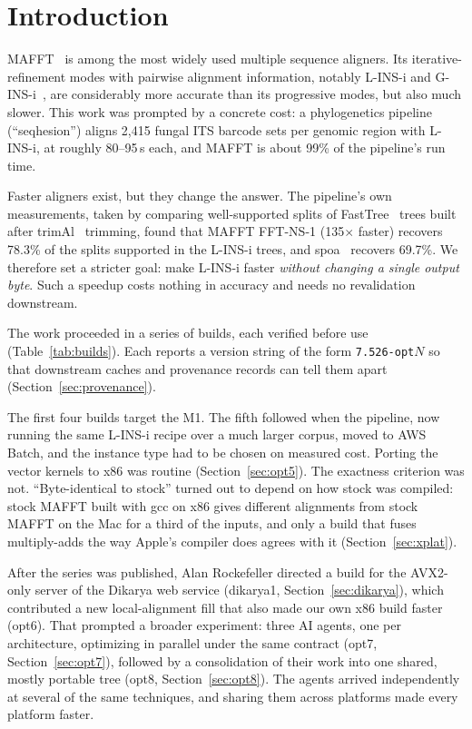 \documentclass[11pt]{article}
\newcommand{\code}[1]{\texttt{#1}}
\begin{document}
\section{Introduction}

MAFFT~\cite{katoh2002,katoh2013} is among the most widely used multiple sequence aligners.
Its iterative-refinement modes with pairwise alignment information, notably L-INS-i and
G-INS-i~\cite{katoh2005}, are considerably more accurate than its progressive modes, but
also much slower. This work was prompted by a concrete cost: a phylogenetics pipeline
(``seqhesion'') aligns 2{,}415 fungal ITS barcode sets per genomic region with L-INS-i, at
roughly 80--95\,s each, and MAFFT is about 99\% of the pipeline's run time.

Faster aligners exist, but they change the answer. The pipeline's own measurements, taken
by comparing well-supported splits of FastTree~\cite{price2010} trees built after
trimAl~\cite{capella2009} trimming, found that MAFFT FFT-NS-1 (135$\times$ faster) recovers
78.3\% of the splits supported in the L-INS-i trees, and spoa~\cite{vaser2017} recovers
69.7\%. We therefore set a stricter goal: make L-INS-i faster \emph{without changing a single
output byte}. Such a speedup costs nothing in accuracy and needs no revalidation downstream.

The work proceeded in a series of builds, each verified before use
(Table~\ref{tab:builds}). Each reports a version string of the form \code{7.526-opt}$N$ so
that downstream caches and provenance records can tell them apart
(Section~\ref{sec:provenance}).

The first four builds target the M1. The fifth followed when the pipeline, now running the
same L-INS-i recipe over a much larger corpus, moved to AWS Batch, and the instance type had to be chosen on measured cost. Porting the vector kernels to
x86 was routine (Section~\ref{sec:opt5}). The exactness criterion was not. ``Byte-identical to
stock'' turned out to depend on how stock was compiled: stock MAFFT built with gcc on x86
gives different alignments from stock MAFFT on the Mac for a third of the inputs, and only a
build that fuses multiply-adds the way Apple's compiler does agrees with it
(Section~\ref{sec:xplat}).

After the series was published, Alan Rockefeller directed a build for the AVX2-only server of
the Dikarya web service (dikarya1, Section~\ref{sec:dikarya}), which contributed a new local-alignment fill that also made our own x86
build faster (opt6). That prompted a broader experiment: three AI agents, one per architecture,
optimizing in parallel under the same contract (opt7, Section~\ref{sec:opt7}), followed by a
consolidation of their work into one shared, mostly portable tree (opt8,
Section~\ref{sec:opt8}). The agents arrived independently at several of the same techniques, and
sharing them across platforms made every platform faster.
\end{document}
